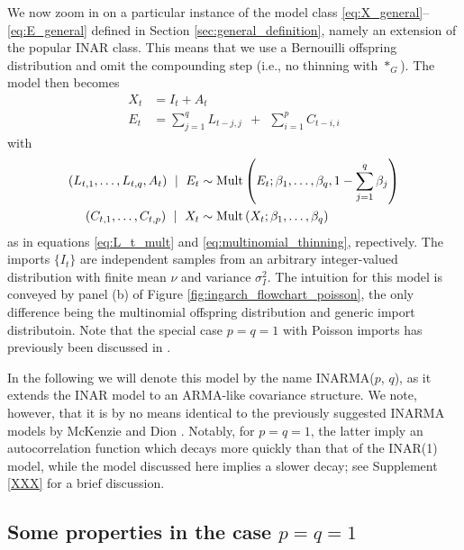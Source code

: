\documentclass{article}
\begin{document}
We now zoom in on a particular instance of the model class \eqref{eq:X_general}--\eqref{eq:E_general} defined in Section \ref{sec:general_definition}, namely an extension of the popular INAR class. This means that we use a Bernouilli offspring distribution and omit the compounding step (i.e., no thinning with $*_G$). The model then becomes
\begin{align}
X_t & = I_t + A_t\label{eq:X_inarma}\\
E_t & = \sum_{j = 1}^q L_{t - j, j} \ \ + \ \ \sum_{i = 1}^p C_{t - i, i}\label{eq:E_inarma}
\end{align}
with
\begin{align}
(L_{t, 1}, \dots, L_{t, q}, A_t) \ \mid \ E_t & \sim \textnormal{Mult}\left(E_t; \beta_1, \dots, \beta_q, 1 - \sum_{j = 1}^q \beta_j\right)\\
(C_{t, 1}, \dots, C_{t, p}) \ \mid \ X_t & \sim \text{Mult}\left(X_t; \beta_1, \dots, \beta_q\right)\label{eq:C_t_inarma}
\end{align}
as in equations \eqref{eq:L_t_mult} and \eqref{eq:multinomial_thinning}, repectively. The imports $\{I_t\}$ are independent samples from an arbitrary integer-valued distribution with finite mean $\nu$ and variance $\sigma^2_I$. The intuition for this model is conveyed by panel (b) of Figure \ref{fig:ingarch_flowchart_poisson}, the only difference being the multinomial offspring distribution and generic import distributoin. Note that the special case $p = q = 1$ with Poisson imports has previously been discussed in \cite{Bracher2019}.

In the following we will denote this model by the name INARMA($p$, $q$), as it extends the INAR model to an ARMA-like covariance structure. We note, however, that it is by no means identical to the previously suggested INARMA models by McKenzie \cite{McKenzie1988} and Dion \cite{Dion1995}. Notably, for $p = q = 1$, the latter imply an autocorrelation function which decays more quickly than that of the INAR(1) model, while the model discussed here implies a slower decay; see Supplement \ref{XXX} for a brief discussion.

\subsection{Some properties in the case $p = q = 1$}
\end{document}
